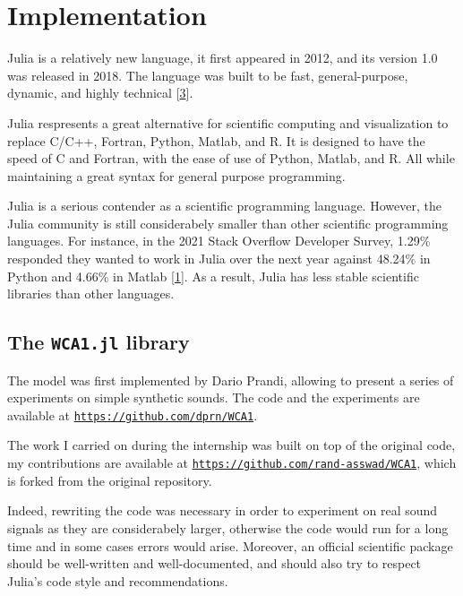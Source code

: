 \documentclass[
  american,
]{article}
\begin{document}
\pagebreak

\hypertarget{implementation}{%
\section{Implementation}\label{implementation}}

Julia is a relatively new language, it first appeared in 2012,
and its version 1.0 was released in 2018.
The language was built to be fast, general-purpose, dynamic,
and highly technical {[}\protect\hyperlink{ref-julia2018}{3}{]}.

Julia respresents a great alternative for scientific computing
and visualization to replace C/C++, Fortran, Python, Matlab, and R.
It is designed to have the speed of C and Fortran,
with the ease of use of Python, Matlab, and R.
All while maintaining a great syntax for general purpose programming.

Julia is a serious contender as a scientific programming language.
However, the Julia community is still considerabely smaller
than other scientific programming languages.
For instance, in the 2021 Stack Overflow Developer Survey,
1.29\% responded they wanted to work in Julia over the next year
against 48.24\% in Python and 4.66\% in Matlab {[}\protect\hyperlink{ref-so_survey2021}{1}{]}.
As a result, Julia has less stable scientific libraries than
other languages.

\hypertarget{the-wca1.jl-library}{%
\subsection{\texorpdfstring{The \texttt{WCA1.jl} library}{The WCA1.jl library}}\label{the-wca1.jl-library}}

The model was first implemented by Dario Prandi,
allowing to present a series of experiments on simple synthetic sounds.
The code and the experiments are available at
\href{https://github.com/dprn/WCA1}{\texttt{https://github.com/dprn/WCA1}}.

The work I carried on during the internship was built on top of the original code,
my contributions are available at
\href{https://github.com/rand-asswad/WCA1}{\texttt{https://github.com/rand-asswad/WCA1}},
which is forked from the original repository.

Indeed, rewriting the code was necessary in order to experiment
on real sound signals as they are considerabely larger,
otherwise the code would run for a long time and in some cases
errors would arise.
Moreover, an official scientific package should be well-written
and well-documented, and should also try to respect Julia's
code style and recommendations.
\end{document}
